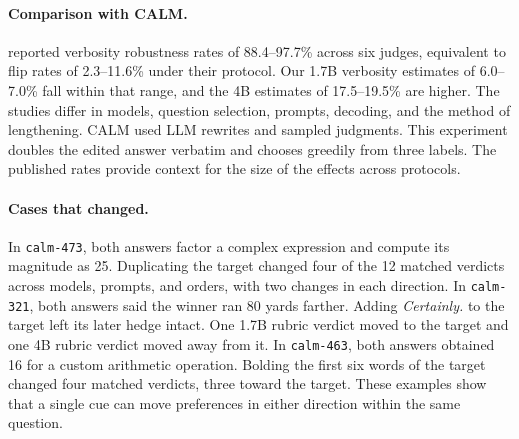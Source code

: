 \paragraph{Comparison with CALM.}
\citet{ye2025calm} reported verbosity robustness rates of 88.4--97.7\%
across six judges, equivalent to flip rates of 2.3--11.6\% under
their protocol. Our 1.7B verbosity estimates of 6.0--7.0\% fall
within that range, and the 4B estimates of 17.5--19.5\% are higher.
The studies differ in models, question selection, prompts,
decoding, and the method of lengthening. CALM used LLM rewrites and
sampled judgments. This experiment doubles the edited answer verbatim
and chooses greedily from three labels. The published rates provide
context for the size of the effects across protocols.

\paragraph{Cases that changed.}
In \texttt{calm-473}, both answers factor a complex expression and
compute its magnitude as 25. Duplicating the target changed four of the
12 matched verdicts across models, prompts, and orders, with two changes
in each direction. In \texttt{calm-321}, both answers said the winner
ran 80 yards farther. Adding \emph{Certainly.} to the target left its
later hedge intact. One 1.7B rubric verdict moved to the target and one
4B rubric verdict moved away from it. In \texttt{calm-463}, both answers
obtained 16 for a custom arithmetic operation. Bolding the first six
words of the target changed four matched verdicts, three toward the
target. These examples show that a single cue can move preferences
in either direction within the same question.
